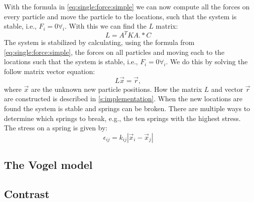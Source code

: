 
With the formula in \eqref{eq:single:force:simple} we can now compute all the forces on every particle and move the particle to the locations, such that the system is stable, i.e., $F_i = 0 \forall_i$. With this we can find the $L$ matrix:
%
\begin{equation}\label{eq:method:stabilizationEquationLHS}
	L = A^T K A .* C
\end{equation}
%
The system is stabilized by calculating, using the formula from \eqref{eq:single:force:simple}, the forces on all particles and moving each to the locations such that the system is stable, i.e., $F_i = 0 \forall_i$. We do this by solving the follow matrix vector equation:
%
\begin{equation}\label{eq:method:stabilizationEquation}
	L\vec{x} = \vec{r},
\end{equation}
%
where $\vec{x}$ are the unknown new particle positions. How the matrix $L$ and vector $\vec{r}$ are constructed is described in \cref{s:implementation}. When the new locations are found the system is stable and springs can be broken. There are multiple ways to determine which springs to break, e.g., the ten springs with the highest stress. The stress on a spring is given by:
\begin{equation}\label{eq:spring:stress}
	\epsilon_{ij} = k_{ij} |\vec{x}_i - \vec{x}_j|
\end{equation}


\subsection{The Vogel model}\label{ss:method:vogel}


\subsection{Contrast}\label{ss:method:contrast}




